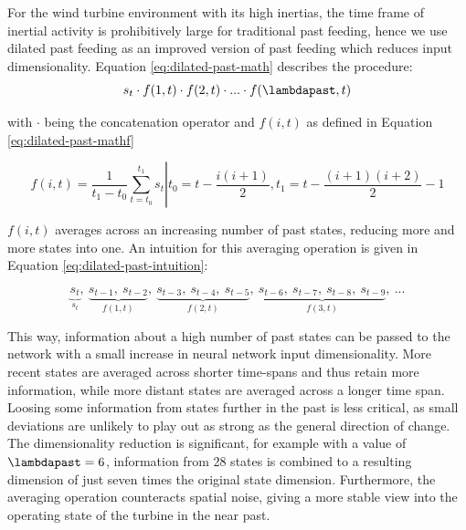 For the wind turbine environment with its high inertias, the time frame of inertial activity is prohibitively large for traditional past feeding, hence we use dilated past feeding as an improved version of past feeding which reduces input dimensionality. Equation \ref{eq:dilated-past-math} describes the procedure:
\begin{equation}
 s_t \cdot f(1, t) \cdot f(2, t) \cdot ... \cdot f(\lambdapast, t)
\label{eq:dilated-past-math}
\end{equation}

with $\cdot$ being the concatenation operator and $f(i, t)$ as defined in Equation \ref{eq:dilated-past-mathf}

\begin{equation}
\left. f(i, t) = \frac{1}{t_1 - t_0}\sum^{t_1}_{t=t_0} s_t \right| t_0 = t-\frac{i(i+1)}{2}, t_1 = t-\frac{(i+1)(i+2)}{2} - 1
\label{eq:dilated-past-mathf}
\end{equation}

$f(i, t)$ averages across an increasing number of past states, reducing more and more states into one. An intuition for this averaging operation is given in Equation \ref{eq:dilated-past-intuition}:

\begin{equation}
\underbrace{s_t}_{s_t},\: \underbrace{s_{t-1},\: s_{t-2}}_{f(1,t)},\: \underbrace{s_{t-3},\: s_{t-4},\: s_{t-5}}_{f(2,t)},\: \underbrace{s_{t-6},\: s_{t-7},\: s_{t-8},\: s_{t-9}}_{f(3,t)},\: ...
\label{eq:dilated-past-intuition}
\end{equation}

This way, information about a high number of past states can be passed to the network with a small increase in neural network input dimensionality. More recent states are averaged across shorter time-spans and thus retain more information, while more distant states are averaged across a longer time span. Loosing some information from states further in the past is less critical, as small deviations are unlikely to play out as strong as the general direction of change. The dimensionality reduction is significant, for example with a value of $\lambdapast = 6$, information from 28 states is combined to a resulting dimension of just seven times the original state dimension. Furthermore, the averaging operation counteracts spatial noise, giving a more stable view into the operating state of the turbine in the near past.


